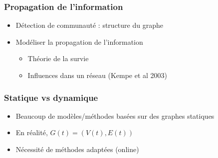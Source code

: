 \documentclass[c]{beamer}
\begin{document}
\begin{frame}
    \frametitle{Propagation de l'information}

    \begin{itemize}
        \item Détection de communauté : structure du graphe
        \item Modéliser la propagation de l'information
            \begin{itemize}
                \item Théorie de la survie
                \item Influences dans un réseau (Kempe et al 2003)
            \end{itemize}
    \end{itemize}
\end{frame}

\begin{frame}
    \frametitle{Statique vs dynamique}

    \begin{itemize}
        \item Beaucoup de modèles/méthodes basées sur des graphes statiques
        \item En réalité, $G(t) = (V(t), E(t))$
        \item Nécessité de méthodes adaptées (online)
    \end{itemize}
\end{frame}
\end{document}
